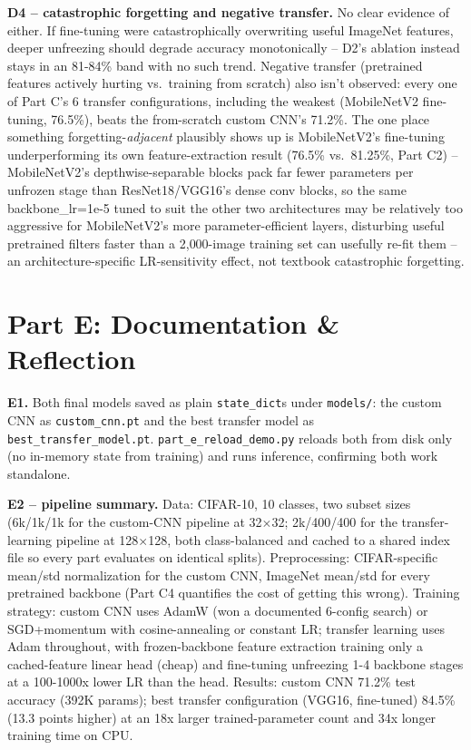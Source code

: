 \documentclass[11pt,a4paper]{article}
\begin{document}
\textbf{D4 -- catastrophic forgetting and negative transfer.} No clear evidence of either.
If fine-tuning were catastrophically overwriting useful ImageNet features, deeper unfreezing
should degrade accuracy monotonically -- D2's ablation instead stays in an 81-84\% band with
no such trend. Negative transfer (pretrained features actively hurting vs.\ training from
scratch) also isn't observed: every one of Part C's 6 transfer configurations, including the
weakest (MobileNetV2 fine-tuning, 76.5\%), beats the from-scratch custom CNN's 71.2\%. The
one place something forgetting-\emph{adjacent} plausibly shows up is MobileNetV2's
fine-tuning underperforming its own feature-extraction result (76.5\% vs.\ 81.25\%, Part C2)
-- MobileNetV2's depthwise-separable blocks pack far fewer parameters per unfrozen stage than
ResNet18/VGG16's dense conv blocks, so the same backbone\_lr=1e-5 tuned to suit the other two
architectures may be relatively too aggressive for MobileNetV2's more parameter-efficient
layers, disturbing useful pretrained filters faster than a 2{,}000-image training set can
usefully re-fit them -- an architecture-specific LR-sensitivity effect, not textbook
catastrophic forgetting.

\section*{Part E: Documentation \& Reflection}

\textbf{E1.} Both final models saved as plain \texttt{state\_dict}s under \texttt{models/}:
the custom CNN as \texttt{custom\_cnn.pt} and the best transfer model as
\texttt{best\_transfer\_model.pt}. \texttt{part\_e\_reload\_demo.py} reloads both from disk
only (no in-memory state from training) and runs inference, confirming both work standalone.

\textbf{E2 -- pipeline summary.} Data: CIFAR-10, 10 classes, two subset sizes (6k/1k/1k for
the custom-CNN pipeline at 32$\times$32; 2k/400/400 for the transfer-learning pipeline at
128$\times$128, both class-balanced and cached to a shared index file so every part evaluates
on identical splits). Preprocessing: CIFAR-specific mean/std normalization for the custom
CNN, ImageNet mean/std for every pretrained backbone (Part C4 quantifies the cost of getting
this wrong). Training strategy: custom CNN uses AdamW (won a documented 6-config search) or
SGD+momentum with cosine-annealing or constant LR; transfer learning uses Adam throughout,
with frozen-backbone feature extraction training only a cached-feature linear head (cheap)
and fine-tuning unfreezing 1-4 backbone stages at a 100-1000x lower LR than the head.
Results: custom CNN 71.2\% test accuracy (392K params); best transfer configuration (VGG16,
fine-tuned) 84.5\% (13.3 points higher) at an 18x larger trained-parameter count and 34x
longer training time on CPU.
\end{document}

